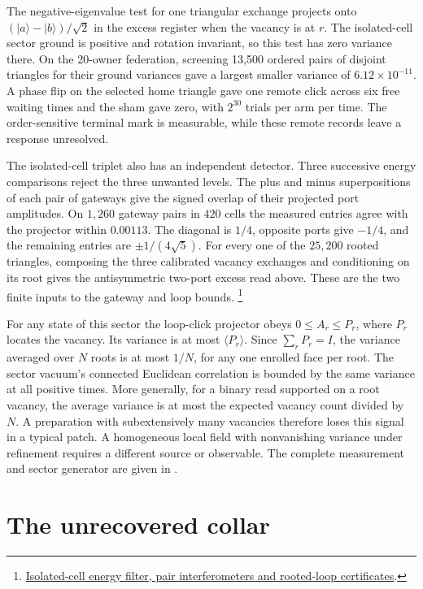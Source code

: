 \documentclass[11pt]{article}
\theoremstyle{definition}
\theoremstyle{remark}
\theoremstyle{plain}
\begin{document}
The negative-eigenvalue test for one triangular exchange projects onto
$(|a\rangle-|b\rangle)/\sqrt2$ in the excess register when the vacancy is
at $r$. The isolated-cell sector ground is positive and rotation invariant,
so this test has zero variance there. On the 20-owner federation, screening
13,500 ordered pairs of disjoint triangles for their ground variances gave
a largest smaller variance of $6.12\times10^{-11}$. A phase flip on the
selected home triangle gave one remote click across six free waiting times
and the sham gave zero, with $2^{30}$ trials per arm per time. The
order-sensitive terminal mark is measurable, while these remote records
leave a response unresolved.

The isolated-cell triplet also has an independent detector. Three
successive energy comparisons reject the three unwanted levels. The
plus and minus superpositions of each pair of gateways give the signed
overlap of their projected port amplitudes. On $1{,}260$ gateway pairs
in $420$ cells the measured entries agree with the projector within
$0.00113$. The diagonal is $1/4$, opposite ports give $-1/4$, and the
remaining entries are $\pm1/(4\sqrt{5})$. For every one of the
$25{,}200$ rooted triangles, composing the three calibrated vacancy
exchanges and conditioning on its root gives the antisymmetric
two-port excess read above. These are the two finite inputs to the
gateway and loop bounds.%
\footnote{\href{https://github.com/FloatingPragma/observer-patch-holography/tree/main/model/experiments/interval_echo_gauge/singlet_flight/gateway_meter}{Isolated-cell energy filter, pair interferometers and rooted-loop certificates}.}

For any state of this sector the loop-click projector obeys $0\le A_r\le
P_r$, where $P_r$ locates the vacancy. Its variance is at most
$\langle P_r\rangle$. Since $\sum_r P_r=I$, the variance averaged over
$N$ roots is at most $1/N$, for any one enrolled face per root. The sector
vacuum's connected Euclidean correlation is bounded by the same variance
at all positive times. More generally, for a binary read supported on a root
vacancy, the average variance is at most the expected vacancy count divided by
$N$. A preparation with subextensively many vacancies therefore loses this
signal in a typical patch. A homogeneous local field with nonvanishing variance
under refinement requires a different source or observable. The complete
measurement and sector generator are given in
.

\section{The unrecovered collar}
\label{sec:collar}
\end{document}
